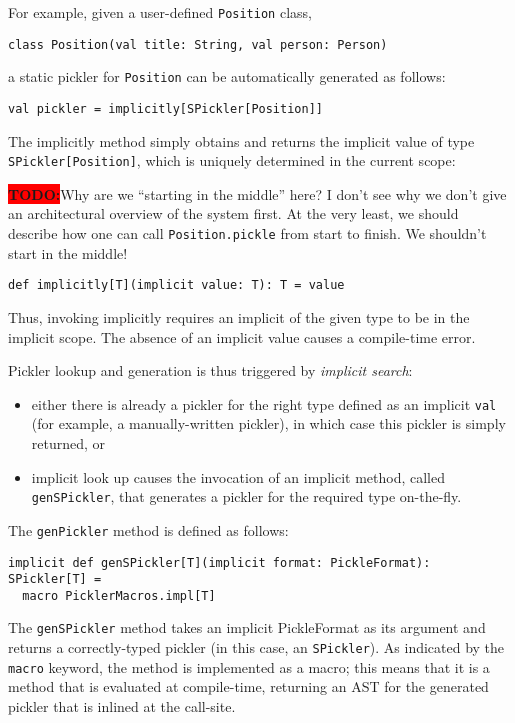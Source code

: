 \documentclass[preprint,10pt]{sigplanconf}
\theoremstyle{definition}
\newcommand{\todo}{{\bf \colorbox{red}{\color{white}TODO:}}}
\newcommand{\term}[1]{\mbox{\texttt{#1}}}
\begin{document}
For example, given a user-defined \term{Position} class,

\begin{lstlisting}
class Position(val title: String, val person: Person)
\end{lstlisting}

a static pickler for \term{Position} can be automatically generated as
follows:

\begin{lstlisting}
val pickler = implicitly[SPickler[Position]]
\end{lstlisting}

The implicitly method simply obtains and returns the implicit value of type
\term{SPickler[Position]}, which is uniquely determined in the current scope:

\todo Why are we ``starting in the middle'' here? I don't see why we don't
give an architectural overview of the system first. At the very least, we
should describe how one can call \term{Position.pickle} from start to finish.
We shouldn't start in the middle!

\begin{lstlisting}
def implicitly[T](implicit value: T): T = value
\end{lstlisting}

Thus, invoking implicitly requires an implicit of the given type to be in the
implicit scope. The absence of an implicit value causes a compile-time error.

Pickler lookup and generation is thus triggered by {\em implicit search}:

\begin{itemize}
\item either there is already a pickler for the right type defined as an
implicit \term{val} (for example, a manually-written pickler), in which case
this pickler is simply returned, or
\item implicit look up causes the invocation of an implicit method, called
\term{genSPickler}, that generates a pickler for the required type on-the-fly.
\end{itemize}

The \term{genPickler} method is defined as follows:

\begin{lstlisting}
implicit def genSPickler[T](implicit format: PickleFormat): SPickler[T] =
  macro PicklerMacros.impl[T]
\end{lstlisting}

The \term{genSPickler} method takes an implicit PickleFormat as its argument and
returns a correctly-typed pickler (in this case, an \term{SPickler}). As indicated by
the \term{macro} keyword, the method is implemented as a macro; this means
that it is a method that is evaluated at compile-time, returning an AST for
the generated pickler that is inlined at the call-site.
\end{document}
